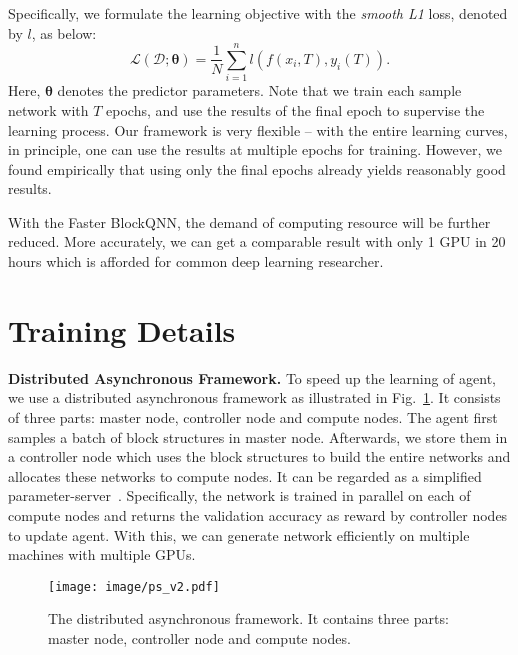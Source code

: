 \documentclass[10pt,journal,compsoc]{IEEEtran}
\begin{document}
Specifically, we formulate the learning objective with the \emph{smooth L1} loss,
denoted by $l$, as below:
\begin{equation}
\mathcal{L}(\mathcal{D}; \boldsymbol\theta) =
\frac{1}{N} \sum_{i=1}^n l \left(f(x_i, T), y_i(T)\right).
\end{equation}
Here, $\boldsymbol\theta$ denotes the predictor parameters.
Note that we train each sample network with $T$ epochs, and use the results of
the final epoch to supervise the learning process.
Our framework is very flexible -- with the entire learning curves, in principle,
one can use the results at multiple epochs for training.
However, we found empirically that using only the final epochs already yields
reasonably good results.

With the Faster BlockQNN, the demand of computing resource will be further reduced.
More accurately, we can get a comparable result with only 1 GPU in 20 hours which is afforded for common deep learning researcher.


\section{ Training Details}



\vspace{0.1cm}\noindent \textbf{Distributed Asynchronous Framework.} To speed up the learning of agent, we use a distributed asynchronous framework as illustrated in Fig.~\ref{fig:ps}. It consists of three parts: master node, controller node and compute nodes. The agent first samples a batch of block structures in master node. Afterwards, we store them in a controller node which uses the block structures to build the entire networks and allocates these networks to compute nodes. 
It can be regarded as a simplified parameter-server~\cite{dean2012large,li2013parameter}. Specifically, the network is trained in parallel on each of compute nodes and returns the validation accuracy as reward by controller nodes to update agent. With this, we can generate network efficiently on multiple machines with multiple GPUs. 


\begin{figure}[tbp]
	\centering
	\texttt{[image: image/ps\_v2.pdf]}
	\caption{The distributed asynchronous  framework. It contains three parts: master node, controller node and compute nodes.}\label{fig:ps}
\end{figure}
\end{document}
